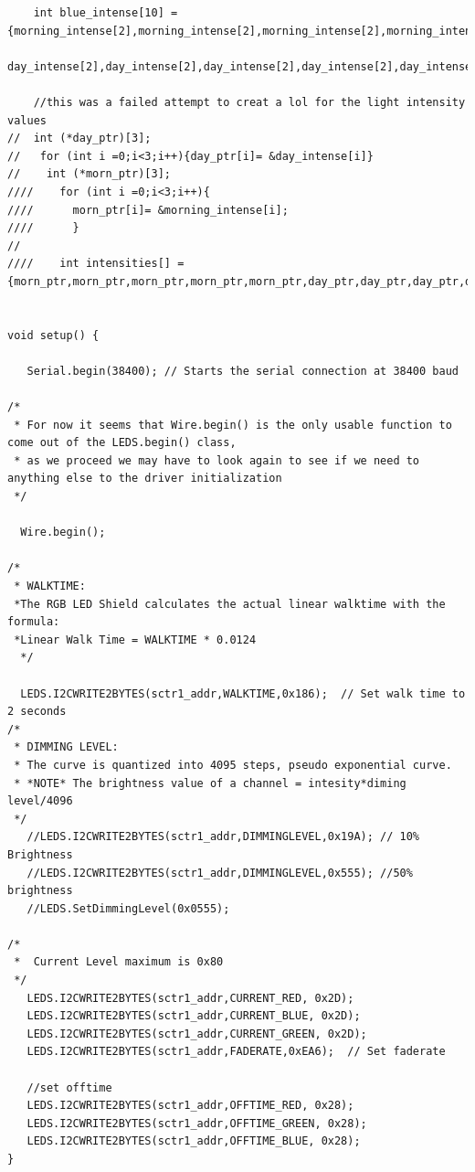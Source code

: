 \documentclass[12pt,a4paper]{report}
\begin{document}
\begin{lstlisting}
    int blue_intense[10] = {morning_intense[2],morning_intense[2],morning_intense[2],morning_intense[2],morning_intense[2],
    day_intense[2],day_intense[2],day_intense[2],day_intense[2],day_intense[2]};

    //this was a failed attempt to creat a lol for the light intensity values
//  int (*day_ptr)[3];
//   for (int i =0;i<3;i++){day_ptr[i]= &day_intense[i]}
//    int (*morn_ptr)[3];
////    for (int i =0;i<3;i++){
////      morn_ptr[i]= &morning_intense[i];
////      }
//   
////    int intensities[] = {morn_ptr,morn_ptr,morn_ptr,morn_ptr,morn_ptr,day_ptr,day_ptr,day_ptr,day_ptr,day_ptr};
      
 
void setup() {

   Serial.begin(38400); // Starts the serial connection at 38400 baud

/*
 * For now it seems that Wire.begin() is the only usable function to come out of the LEDS.begin() class,
 * as we proceed we may have to look again to see if we need to anything else to the driver initialization
 */
       
  Wire.begin();
  
/*
 * WALKTIME:
 *The RGB LED Shield calculates the actual linear walktime with the formula:
 *Linear Walk Time = WALKTIME * 0.0124
  */
  
  LEDS.I2CWRITE2BYTES(sctr1_addr,WALKTIME,0x186);  // Set walk time to 2 seconds
/*
 * DIMMING LEVEL:
 * The curve is quantized into 4095 steps, pseudo exponential curve.
 * *NOTE* The brightness value of a channel = intesity*diming level/4096
 */
   //LEDS.I2CWRITE2BYTES(sctr1_addr,DIMMINGLEVEL,0x19A); // 10% Brightness
   //LEDS.I2CWRITE2BYTES(sctr1_addr,DIMMINGLEVEL,0x555); //50% brightness
   //LEDS.SetDimmingLevel(0x0555);

/* 
 *  Current Level maximum is 0x80
 */
   LEDS.I2CWRITE2BYTES(sctr1_addr,CURRENT_RED, 0x2D);
   LEDS.I2CWRITE2BYTES(sctr1_addr,CURRENT_BLUE, 0x2D);
   LEDS.I2CWRITE2BYTES(sctr1_addr,CURRENT_GREEN, 0x2D);
   LEDS.I2CWRITE2BYTES(sctr1_addr,FADERATE,0xEA6);  // Set faderate

   //set offtime
   LEDS.I2CWRITE2BYTES(sctr1_addr,OFFTIME_RED, 0x28);
   LEDS.I2CWRITE2BYTES(sctr1_addr,OFFTIME_GREEN, 0x28);
   LEDS.I2CWRITE2BYTES(sctr1_addr,OFFTIME_BLUE, 0x28);
}


\end{lstlisting}
\end{document}
